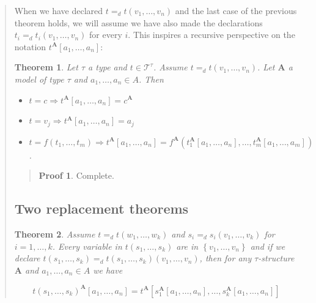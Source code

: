 \documentclass[a4paper, 12pt]{article}
\newtheorem{theorem}{Theorem}
\theoremstyle{definition}
\theoremstyle{definition}
\theoremstyle{definition}
\newtheorem{pro}{Proof}
\begin{document}
\begin{quote}
When we have declared $t =_d t(v_1, \ldots, v_n)$ and the last case of the
previous theorem holds, we will assume we have also made the declarations $t_i
=_d t_i(v_1,\ldots, v_n)$ for every $i$. This inspires a recursive perspective 
on the notation $t^\textbf{A}[a_1, \ldots, a_n]$: 

\begin{theorem}
    Let $\tau$ a type and $t \in \mathcal{T}^\tau$. Assume $t =_d t(v_1, \ldots, v_n)$.
    Let $\textbf{A}$ a model of type $\tau$ and $a_1, \ldots, a_n \in A$.
    Then 

    \begin{itemize}
        \item $t = c \Rightarrow t^\textbf{A}[a_1, \ldots, a_n] = c^\textbf{A}$
        \item $t = v_j \Rightarrow t^\textbf{A}[a_1, \ldots, a_n] = a_j$
        \item $t = f(t_1,\ldots, t_m) \Rightarrow t^\textbf{A}[a_1, \ldots, a_n] = f^\textbf{A}(t_1^\textbf{A}[a_1, \ldots, a_n], \ldots, t_m^\textbf{A}[a_1,\ldots, a_m])$.
    \end{itemize}
\end{theorem}


\small
\begin{quote}

\begin{pro}
    Complete.
\end{pro}

\end{quote}
\normalsize

\subsection{Two replacement theorems}

\begin{theorem}
    Assume $t =_d t(w_1, \ldots, w_k)$ and $s_i =_d s_i(v_1,\ldots, v_k)$ for $i = 1, \ldots, k$.
    Every variable in $t(s_1, \ldots, s_k)$ are in $\left\{ v_1, \ldots, v_n \right\} $ and 
    if we declare $t(s_1, \ldots, s_k) =_d t(s_1, \ldots, s_k)(v_1, \ldots, v_n)$, then 
    for any $\tau$-structure $\textbf{A}$ and $a_1, \ldots, a_n \in A$ we have 

    \begin{equation*}
        t(s_1, \ldots, s_k)^\textbf{A}\left[ a_1,\ldots, a_n \right] = t^\textbf{A}\left[ s_1^\textbf{A}[a_1,\ldots, a_n], \ldots, s_k^\textbf{A}[a_1, \ldots, a_n] \right] 
    \end{equation*}


\end{theorem}
\end{quote}
\end{document}
